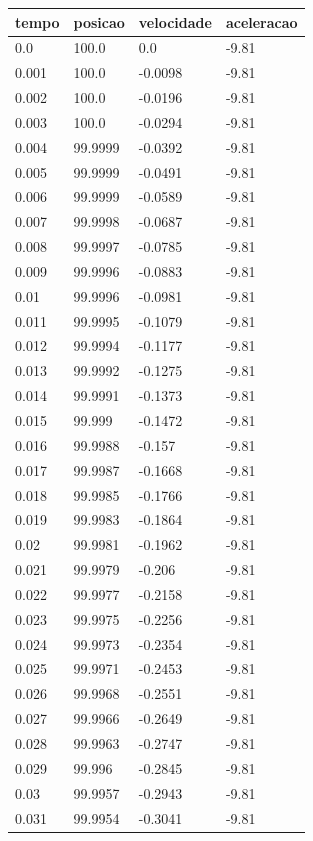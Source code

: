 \begin{tabular}{llll}
\toprule
tempo & posicao & velocidade & aceleracao \\
\midrule
0.0 & 100.0 & 0.0 & -9.81 \\
0.001 & 100.0 & -0.0098 & -9.81 \\
0.002 & 100.0 & -0.0196 & -9.81 \\
0.003 & 100.0 & -0.0294 & -9.81 \\
0.004 & 99.9999 & -0.0392 & -9.81 \\
0.005 & 99.9999 & -0.0491 & -9.81 \\
0.006 & 99.9999 & -0.0589 & -9.81 \\
0.007 & 99.9998 & -0.0687 & -9.81 \\
0.008 & 99.9997 & -0.0785 & -9.81 \\
0.009 & 99.9996 & -0.0883 & -9.81 \\
0.01 & 99.9996 & -0.0981 & -9.81 \\
0.011 & 99.9995 & -0.1079 & -9.81 \\
0.012 & 99.9994 & -0.1177 & -9.81 \\
0.013 & 99.9992 & -0.1275 & -9.81 \\
0.014 & 99.9991 & -0.1373 & -9.81 \\
0.015 & 99.999 & -0.1472 & -9.81 \\
0.016 & 99.9988 & -0.157 & -9.81 \\
0.017 & 99.9987 & -0.1668 & -9.81 \\
0.018 & 99.9985 & -0.1766 & -9.81 \\
0.019 & 99.9983 & -0.1864 & -9.81 \\
0.02 & 99.9981 & -0.1962 & -9.81 \\
0.021 & 99.9979 & -0.206 & -9.81 \\
0.022 & 99.9977 & -0.2158 & -9.81 \\
0.023 & 99.9975 & -0.2256 & -9.81 \\
0.024 & 99.9973 & -0.2354 & -9.81 \\
0.025 & 99.9971 & -0.2453 & -9.81 \\
0.026 & 99.9968 & -0.2551 & -9.81 \\
0.027 & 99.9966 & -0.2649 & -9.81 \\
0.028 & 99.9963 & -0.2747 & -9.81 \\
0.029 & 99.996 & -0.2845 & -9.81 \\
0.03 & 99.9957 & -0.2943 & -9.81 \\
0.031 & 99.9954 & -0.3041 & -9.81 \\

\end{tabular}
